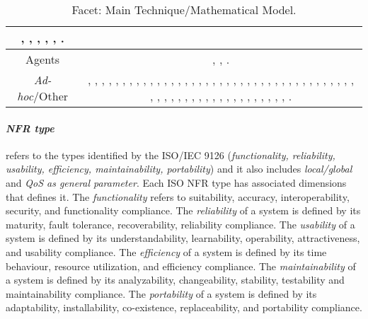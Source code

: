 \begin{table}
\begin{tabular}{|c|c|}
{\cite{p013}, \cite{p028}, \cite{p091}, \cite{p104}, \cite{p140}, \cite{p160}.
}
\\ \hline
Agents	&	
\parbox{0.6\textwidth}{
\cite{p014}, \cite{p078}, \cite{p141}.
}
\\ \hline
\textit{Ad-hoc}/Other	&	
\parbox{0.6\textwidth}{
\cite{p002}, \cite{p004}, \cite{p005}, \cite{p006}, \cite{p009}, \cite{p012}, \cite{p015}, \cite{p018}, \cite{p019}, \cite{p021}, \cite{p023}, \cite{p024}, \cite{p029}, \cite{p034}, \cite{p035}, \cite{p040}, \cite{p044}, \cite{p047}, \cite{p049}, \cite{p050}, \cite{p052}, \cite{p053}, \cite{p057}, \cite{p058}, \cite{p059}, \cite{p061}, \cite{p062}, \cite{p063}, \cite{p064}, \cite{p065}, \cite{p066}, \cite{p067}, \cite{p069}, \cite{p071}, \cite{p073}, \cite{p074}, \cite{p075}, \cite{p076}, \cite{p080}, \cite{p083}, \cite{p094}, \cite{p096}, \cite{p098}, \cite{p100}, \cite{p119}, \cite{p122}, \cite{p128}, \cite{p134}, \cite{p138}, \cite{p146}, \cite{p147}, \cite{p149}, \cite{p150}, \cite{p151}, \cite{p153}, \cite{p156}, \cite{p157}, \cite{p159}, \cite{p163}, \cite{p168}.
}
\\ \hline
\end{tabular}
\caption{\label{table:biblioMTMM} Facet: Main Technique/Mathematical Model.}
\end{table}

\paragraph{\bf\em NFR type} 
refers to the types identified by the ISO/IEC 9126 ({\em functionality, reliability, usability, efficiency, maintainability, portability}) and it also includes  {\em local/global } and {\em QoS as general parameter}. Each ISO NFR type has associated dimensions that defines it.  The {\em functionality}  refers to suitability, accuracy, interoperability, security, and functionality compliance.	The {\em reliability} of a system is defined by its  maturity, fault tolerance, recoverability, reliability compliance.	The {\em usability} of a system is defined by its understandability, learnability, operability, attractiveness, and usability compliance. The	{\em efficiency} of a system is defined by its  time behaviour, resource utilization,  and efficiency compliance.	The {\em maintainability} of a system is defined by its analyzability, changeability, stability, testability and maintainability compliance.	The {\em portability} of a system is defined by its adaptability, installability, co-existence, replaceability, and portability compliance.					

